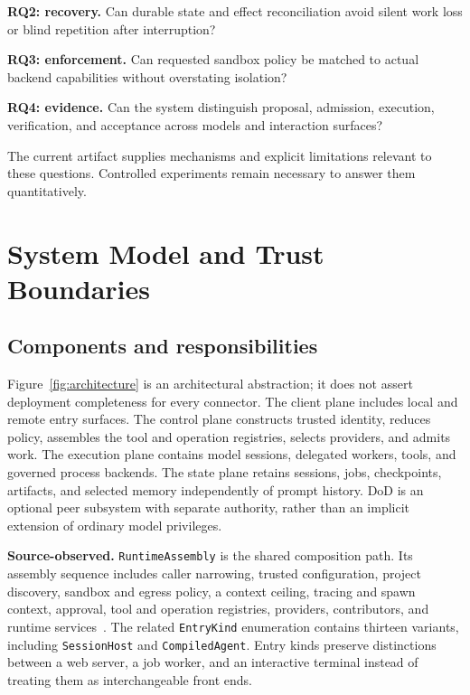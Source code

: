 \textbf{RQ2: recovery.} Can durable state and effect reconciliation avoid silent work loss or blind repetition after interruption?

\textbf{RQ3: enforcement.} Can requested sandbox policy be matched to actual backend capabilities without overstating isolation?

\textbf{RQ4: evidence.} Can the system distinguish proposal, admission, execution, verification, and acceptance across models and interaction surfaces?

The current artifact supplies mechanisms and explicit limitations relevant to these questions. Controlled experiments remain necessary to answer them quantitatively.

\section{System Model and Trust Boundaries}
\label{sec:system-model}

\subsection{Components and responsibilities}

Figure~\ref{fig:architecture} is an architectural abstraction; it does not assert deployment completeness for every connector. The client plane includes local and remote entry surfaces. The control plane constructs trusted identity, reduces policy, assembles the tool and operation registries, selects providers, and admits work. The execution plane contains model sessions, delegated workers, tools, and governed process backends. The state plane retains sessions, jobs, checkpoints, artifacts, and selected memory independently of prompt history. DoD is an optional peer subsystem with separate authority, rather than an implicit extension of ordinary model privileges.



\textbf{Source-observed.} \texttt{RuntimeAssembly} is the shared composition path. Its assembly sequence includes caller narrowing, trusted configuration, project discovery, sandbox and egress policy, a context ceiling, tracing and spawn context, approval, tool and operation registries, providers, contributors, and runtime services~\cite{ref4}. The related \texttt{EntryKind} enumeration contains thirteen variants, including \texttt{SessionHost} and \texttt{CompiledAgent}. Entry kinds preserve distinctions between a web server, a job worker, and an interactive terminal instead of treating them as interchangeable front ends.

